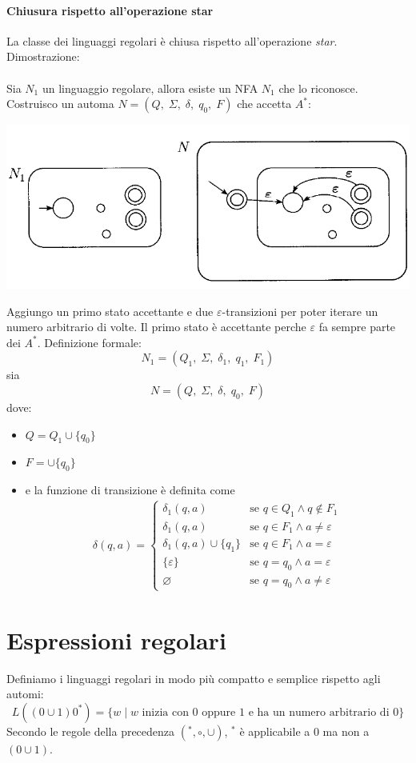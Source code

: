 \documentclass[italian]{article}
\newcommand{\taleche}{\;|\;}
\begin{document}
\paragraph{Chiusura rispetto all'operazione star}
La classe dei linguaggi regolari è chiusa rispetto all'operazione \textit{star}. Dimostrazione: \\\\
Sia $N_1$ un linguaggio regolare, allora esiste un NFA $N_1$ che lo riconosce. Costruisco un automa $N = (Q,\;\Sigma,\;\delta,\;q_0,\;F)$ che accetta $A^*$:
\begin{center}
	\includegraphics[width=0.7\linewidth]{images/nfa_star}
\end{center}
Aggiungo un primo stato accettante e due $\varepsilon$-transizioni per poter iterare un numero arbitrario di volte. Il primo stato è accettante perche $\varepsilon$ fa sempre parte dei $A^*$. Definizione formale:
\[
	N_1 = (Q_1,\;\Sigma,\;\delta_1,\;q_1,\;F_1)
\]
sia 
\[
	N = (Q,\;\Sigma,\;\delta,\;q_0,\;F)
\]
dove:
\begin{itemize}
	\item $Q = Q_1 \cup \{q_0\}$
	\item $F = \cup \{q_0\}$
	\item e la funzione di transizione è definita come
	\begin{align*}
	\delta(q,a) = 
	\begin{cases}
	\delta_1(q,a) & \text{se } q \in Q_1 \land q \notin F_1 \\
	\delta_1(q,a) & \text{se } q \in F_1 \land a \neq \varepsilon \\
	\delta_1(q,a) \cup \{q_1\} & \text{se } q \in F_1 \land a = \varepsilon\\
	\{\varepsilon\} & \text{se } q = q_0 \land a = \varepsilon \\
	\varnothing & \text{se } q = q_0 \land a \neq \varepsilon
	\end{cases}
	\end{align*}
\end{itemize}
\pagebreak
\section{Espressioni regolari}
Definiamo i linguaggi regolari in modo più compatto e semplice rispetto agli automi:
\[
	L((0\cup 1)0^*) = \{ w \taleche w \text{ inizia con $0$ oppure $1$ e ha un numero arbitrario di $0$}\}
\]
Secondo le regole della precedenza $(^*,\circ,\cup)$, $^*$ è applicabile a $0$ ma non a $(0\cup 1)$.
\end{document}
